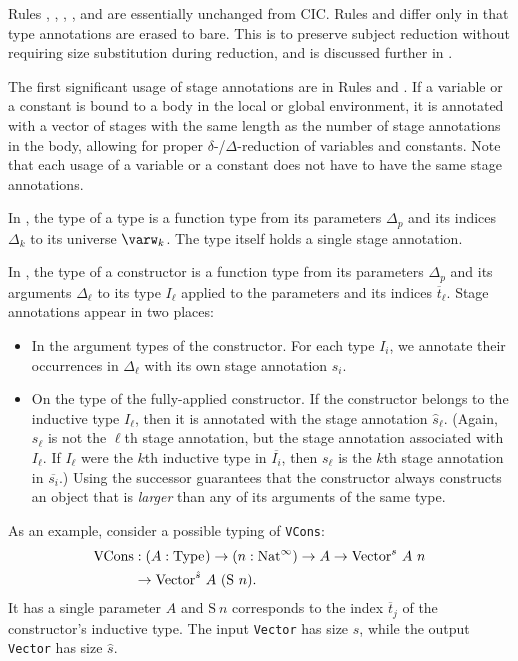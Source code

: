 \documentclass[acmsmall,nonacm,screen,review,anonymous,10pt]{acmart}
\begin{document}
Rules , , ,  , and  are essentially unchanged from CIC. Rules  and  differ only in that type annotations are erased to bare. This is to preserve subject reduction without requiring size substitution during reduction, and is discussed further in \cite{cic-hat-bar}.

The first significant usage of stage annotations are in Rules  and . If a variable or a constant is bound to a body in the local or global environment, it is annotated with a vector of stages with the same length as the number of stage annotations in the body, allowing for proper $\delta$-/$\Delta$-reduction of variables and constants. Note that each usage of a variable or a constant does not have to have the same stage annotations.

In , the type of a \coinductive type is a function type from its parameters $\Delta_p$ and its indices $\Delta_k$ to its universe $\varw_k$. The \coinductive type itself holds a single stage annotation.

In , the type of a constructor is a function type from its parameters $\Delta_p$ and its arguments $\Delta_\ell$ to its \coinductive type $I_\ell$ applied to the parameters and its indices $\overline{t}_\ell$. Stage annotations appear in two places:
\begin{itemize}
    \item In the argument types of the constructor. For each \coinductive type $I_i$, we annotate their occurrences in $\Delta_\ell$ with its own stage annotation $s_i$.
    \item On the \coinductive type of the fully-applied constructor. If the constructor belongs to the inductive type $I_\ell$, then it is annotated with the stage annotation $\hat{s}_\ell$. (Again, $s_\ell$ is not the $\ell$th stage annotation, but the stage annotation associated with $I_\ell$. If $I_\ell$ were the $k$th inductive type in $\overline{I_i}$, then $s_\ell$ is the $k$th stage annotation in $\overline{s_i}$.) Using the successor guarantees that the constructor always constructs an object that is \textit{larger} than any of its arguments of the same type.
\end{itemize}
As an example, consider a possible typing of \texttt{VCons}:
\begin{align*}
\text{VCons} &: (A: \text{Type}_{}) \to (n:\text{Nat}^\infty) \to A \to \text{Vector}^s\ A\ n \\
&\to \text{Vector}^{\hat{s}}\ A\ (\text{S}\ n).
\end{align*}
It has a single parameter $A$ and $\text{S}\ n$ corresponds to the index $\overline{t}_j$ of the constructor's inductive type. The input \texttt{Vector} has size $s$, while the output \texttt{Vector} has size $\hat{s}$.
\end{document}
